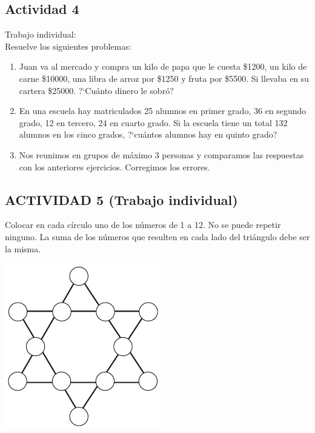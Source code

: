 \documentclass[10pt,twoside]{article}
\begin{document}
\subsection*{Actividad 4}
Trabajo individual:\\
Resuelve los siguientes problemas:
\begin{enumerate}
 \item Juan va al mercado y compra un kilo de papa que le cuesta \$1200, un kilo de carne \$10000, una libra de arroz por \$1250 y fruta por \$5500. Si llevaba en su cartera \$25000. ?`Cu\'anto dinero le sobr\'o?
\item En una escuela hay matriculados 25 alumnos en primer grado, 36 en segundo grado, 12 en tercero, 24 en cuarto grado. Si la escuela tiene un total 132 alumnos en los cinco grados, ?`cu\'antos alumnos hay en quinto grado?
\item Nos reunimos en grupos de m\'aximo 3 personas y comparamos las respuestas con los anteriores ejercicios. Corregimos los errores.
\end{enumerate}
\subsection*{ACTIVIDAD 5 (Trabajo individual)}
Colocar en cada c\'irculo uno de los n\'umeros de 1 a 12. No se puede repetir ninguno. La suma de los n\'umeros que resulten en cada lado del tri\'angulo debe ser la misma.
\begin{center}
 \includegraphics[scale=1.2]{Images/estrella.png}
\end{center}
\end{document}
